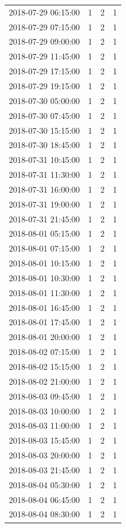 \begin{tabular}{lrrr}
2018-07-29 06:15:00 & 1 & 2 & 1 \\
2018-07-29 07:15:00 & 1 & 2 & 1 \\
2018-07-29 09:00:00 & 1 & 2 & 1 \\
2018-07-29 11:45:00 & 1 & 2 & 1 \\
2018-07-29 17:15:00 & 1 & 2 & 1 \\
2018-07-29 19:15:00 & 1 & 2 & 1 \\
2018-07-30 05:00:00 & 1 & 2 & 1 \\
2018-07-30 07:45:00 & 1 & 2 & 1 \\
2018-07-30 15:15:00 & 1 & 2 & 1 \\
2018-07-30 18:45:00 & 1 & 2 & 1 \\
2018-07-31 10:45:00 & 1 & 2 & 1 \\
2018-07-31 11:30:00 & 1 & 2 & 1 \\
2018-07-31 16:00:00 & 1 & 2 & 1 \\
2018-07-31 19:00:00 & 1 & 2 & 1 \\
2018-07-31 21:45:00 & 1 & 2 & 1 \\
2018-08-01 05:15:00 & 1 & 2 & 1 \\
2018-08-01 07:15:00 & 1 & 2 & 1 \\
2018-08-01 10:15:00 & 1 & 2 & 1 \\
2018-08-01 10:30:00 & 1 & 2 & 1 \\
2018-08-01 11:30:00 & 1 & 2 & 1 \\
2018-08-01 16:45:00 & 1 & 2 & 1 \\
2018-08-01 17:45:00 & 1 & 2 & 1 \\
2018-08-01 20:00:00 & 1 & 2 & 1 \\
2018-08-02 07:15:00 & 1 & 2 & 1 \\
2018-08-02 15:15:00 & 1 & 2 & 1 \\
2018-08-02 21:00:00 & 1 & 2 & 1 \\
2018-08-03 09:45:00 & 1 & 2 & 1 \\
2018-08-03 10:00:00 & 1 & 2 & 1 \\
2018-08-03 11:00:00 & 1 & 2 & 1 \\
2018-08-03 15:45:00 & 1 & 2 & 1 \\
2018-08-03 20:00:00 & 1 & 2 & 1 \\
2018-08-03 21:45:00 & 1 & 2 & 1 \\
2018-08-04 05:30:00 & 1 & 2 & 1 \\
2018-08-04 06:45:00 & 1 & 2 & 1 \\
2018-08-04 08:30:00 & 1 & 2 & 1 \\

\end{tabular}
